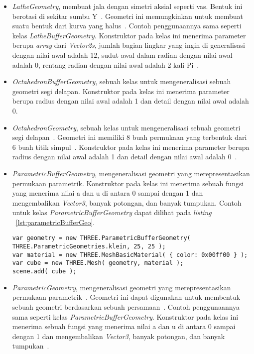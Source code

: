 \begin{itemize}
\begin{itemize}
\begin{lstlisting}[caption={Contoh penggunaan kelas {\it LatheBufferGeometry}.}, label={lst:latheBufferGeo},captionpos=b]
	( i - 5 ) * 2 ) );
}
var geometry = new THREE.LatheBufferGeometry( points );
var material = new THREE.MeshBasicMaterial( { color: 0xffff00 } );
var lathe = new THREE.Mesh( geometry, material );
scene.add( lathe );
\end{lstlisting}
		\item {\it LatheGeometry}, membuat jala dengan simetri aksial seperti vas. Bentuk ini berotasi di sekitar sumbu Y~\cite{threejs}. Geometri ini memungkinkan untuk membuat suatu bentuk dari kurva yang halus~\cite{learningThreejs}. Contoh penggunaannya sama seperti kelas {\it LatheBufferGeometry}. Konstruktor pada kelas ini menerima parameter berupa {\it array} dari {\it Vector2s}, jumlah bagian lingkar yang ingin di generalisasi dengan nilai awal adalah 12, sudut awal dalam radian dengan nilai awal adalah 0, rentang radian dengan nilai awal adalah 2 kali Pi~\cite{threejs}.
		\item {\it OctahedronBufferGeometry}, sebuah kelas untuk mengeneralisasi sebuah geometri segi delapan. Konstruktor pada kelas ini menerima parameter berupa radius dengan nilai awal adalah 1 dan detail dengan nilai awal adalah 0.
		\item {\it OctahedronGeometry}, sebuah kelas untuk mengeneralisasi sebuah geometri segi delapan~\cite{threejs}. Geometri ini memiliki 8 buah permukaan yang terbentuk dari 6 buah titik simpul~\cite{learningThreejs}. Konstruktor pada kelas ini menerima parameter berupa radius dengan nilai awal adalah 1 dan detail dengan nilai awal adalah 0~\cite{threejs}.
		\item {\it ParametricBufferGeometry}, mengeneralisasi geometri yang merepresentasikan permukaan parametrik. Konstruktor pada kelas ini menerima sebuah fungsi yang menerima nilai a dan u di antara 0 sampai dengan 1 dan mengembalikan {\it Vector3}, banyak potongan, dan banyak tumpukan. Contoh untuk kelas {\it ParametricBufferGeometry} dapat dilihat pada {\it listing} ~\ref{lst:parametricBufferGeo}.
\begin{lstlisting}[caption={Contoh penggunaan kelas {\it ParametricBufferGeometry}.}, label={lst:parametricBufferGeo},captionpos=b]
var geometry = new THREE.ParametricBufferGeometry( 
THREE.ParametricGeometries.klein, 25, 25 );
var material = new THREE.MeshBasicMaterial( { color: 0x00ff00 } );
var cube = new THREE.Mesh( geometry, material );
scene.add( cube );
\end{lstlisting}
		\item {\it ParametricGeometry}, mengeneralisasi geometri yang merepresentasikan permukaan parametrik~\cite{threejs}. Geometri ini dapat digunakan untuk membentuk sebuah geometri berdasarkan sebuah persamaan~\cite{learningThreejs}. Contoh penggunaannya sama seperti kelas {\it ParametricBufferGeometry}. Konstruktor pada kelas ini menerima sebuah fungsi yang menerima nilai a dan u di antara 0 sampai dengan 1 dan mengembalikan {\it Vector3}, banyak potongan, dan banyak tumpukan~\cite{threejs}.

\end{itemize}
\end{itemize}
